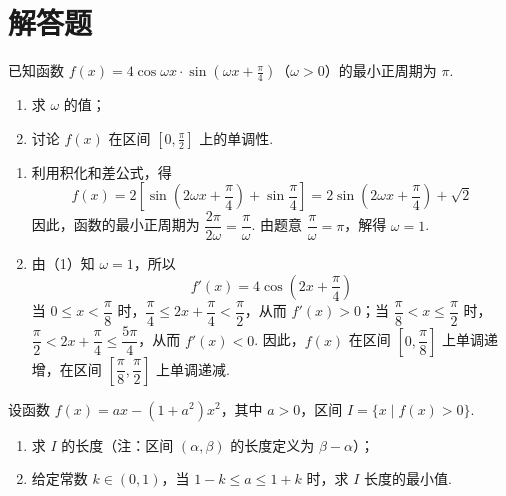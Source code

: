 \section{解答题}

\begin{problem}
已知函数 \(f(x) = 4\cos \omega x \cdot \sin \left( \omega x + \frac{\pi}{4} \right)\)（\(\omega > 0\)）的最小正周期为 \( \pi \).
\begin{enumerate}
\item 求 \( \omega \) 的值；
\item 讨论 \(f(x)\) 在区间 \(\left[0, \frac{\pi}{2}\right]\) 上的单调性.
\end{enumerate}
\end{problem}

\begin{solution}
\begin{enumerate}
\item 利用积化和差公式，得
\[
f(x)=2\left[\sin\left(2\omega x+\frac{\pi}{4}\right)+\sin\frac{\pi}{4}\right]=2\sin\left(2\omega x+\frac{\pi}{4}\right)+\sqrt{2}
\]
因此，函数的最小正周期为 \(\dfrac{2\pi}{2\omega}=\dfrac{\pi}{\omega}\). 由题意 \(\dfrac{\pi}{\omega}=\pi\)，解得 \(\omega=1\).

\item 由（1）知 \(\omega=1\)，所以
\[
f'(x)=4\cos\left(2x+\frac{\pi}{4}\right)
\]
当 \(0\leqslant x<\dfrac{\pi}{8}\) 时，\(\dfrac{\pi}{4}\leqslant2x+\dfrac{\pi}{4}<\dfrac{\pi}{2}\)，从而 \(f'(x)>0\)；当 \(\dfrac{\pi}{8}<x\leqslant\dfrac{\pi}{2}\) 时，\(\dfrac{\pi}{2}<2x+\dfrac{\pi}{4}\leqslant\dfrac{5\pi}{4}\)，从而 \(f'(x)<0\). 因此，\(f(x)\) 在区间 \(\left[0,\dfrac{\pi}{8}\right]\) 上单调递增，在区间 \(\left[\dfrac{\pi}{8},\dfrac{\pi}{2}\right]\) 上单调递减.
\end{enumerate}
\end{solution}

\begin{problem}
设函数 \( f(x) = ax - (1 + a^2)x^2 \)，其中 \(a > 0\)，区间 \( I = \{x \mid f(x) > 0\} \).
\begin{enumerate}
\item 求 \(I\) 的长度（注：区间 \((\alpha, \beta)\) 的长度定义为 \(\beta - \alpha\)）；
\item 给定常数 \(k \in (0,1)\)，当 \(1 - k \leqslant a \leqslant 1 + k\) 时，求 \(I\) 长度的最小值.
\end{enumerate}
\end{problem}

